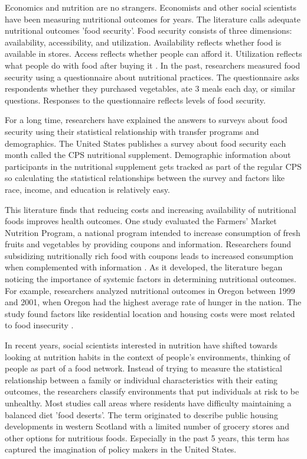 \documentclass{report}
\begin{document}
Economics and nutrition are no strangers. Economists and other social scientists have been measuring nutritional outcomes for years. The literature calls adequate nutritional outcomes 'food security'. Food security consists of three dimensions: availability, accessibility, and utilization. Availability reflects whether food is available in stores. Access reflects whether people can afford it. Utilization reflects what people do with food after buying it \cite{barrett}. In the past, researchers measured food security using a questionnaire about nutritional practices. The questionnaire asks respondents whether they purchased vegetables, ate 3 meals each day, or similar questions. Responses to the questionnaire reflects levels of food security.

For a long time, researchers have explained the answers to surveys about food security using their statistical relationship with transfer programs and demographics. The United States publishes a survey about food security each month called the CPS nutritional supplement. Demographic information about participants in the nutritional supplement gets tracked as part of the regular CPS so calculating the statistical relationships between the survey and factors like race, income, and education is relatively easy.

This literature finds that reducing costs and increasing availability of nutritional foods improves health outcomes. One study evaluated the Farmers' Market Nutrition Program, a national program intended to increase consumption of fresh fruits and vegetables by providing coupons and information. Researchers found subsidizing nutritionally rich food with coupons leads to increased consumption when complemented with information \cite{Just}. As it developed, the literature began noticing the importance of systemic factors in determining nutritional outcomes. For example, researchers analyzed nutritional outcomes in Oregon between 1999 and 2001, when Oregon had the highest average rate of hunger in the nation. The study found factors like residential location and housing costs were most related to food insecurity \cite{Bernell}.

In recent years, social scientists interested in nutrition have shifted towards looking at nutrition habits in the context of people's environments, thinking of people as part of a food network. Instead of trying to measure the statistical relationship between a family or individual characteristics with their eating outcomes, the researchers classify environments that put individuals at risk to be unhealthy. Most studies call areas where residents have difficulty maintaining a balanced diet 'food deserts'. The term originated to describe public housing developments in western Scotland with a limited number of grocery stores and other options for nutritious foods. Especially in the past 5 years, this term has captured the imagination of policy makers in the United States.
\end{document}

